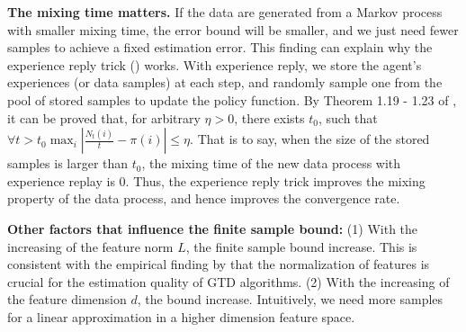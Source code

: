 \documentclass[twoside,11pt]{article}
\numberwithin{equation}{section}
\begin{document}
	
	\textbf{The mixing time matters. } If the data are generated from a Markov process with smaller mixing time, the error bound will be smaller, and we just need fewer samples to achieve a fixed estimation error. This finding can explain why the experience reply trick (\cite{lin1993reinforcement}) works. With experience reply, we store the agent’s experiences (or data samples) at each step, and randomly sample one from the pool of stored samples to update the policy function.  By Theorem 1.19 - 1.23 of \cite{durrett2016poisson}, it can be proved that, for arbitrary $\eta>0$, there exists $t_0$, such that $ \forall t>t_0 \max_i |\frac{N_t(i)}{t} - \pi(i)| \le \eta $. That is to say, when the size of the stored samples is larger than $t_0$, the mixing time of the new data process with experience replay is $0$. Thus, the experience reply trick improves the mixing property of the data process, and hence improves the convergence rate. 
	
	
	
	
	\textbf{Other factors that influence the finite sample bound:}
	(1) With the increasing of the feature norm $ L $, the finite sample bound increase. This is consistent with the empirical finding by \cite{dann2014policy} that the normalization of features is crucial for the estimation quality of GTD algorithms. (2) With the increasing of the feature dimension $ d $, the bound increase.  Intuitively, we need more samples for a linear approximation in a higher dimension feature space. %
	
	
	
	
	
	
\end{document}
